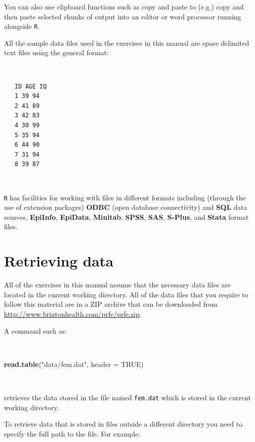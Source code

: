 \documentclass[12pt,a4paper]{book}
\newenvironment{Shaded}{\begin{snugshade}}{\end{snugshade}}
\newcommand{\DataTypeTok}[1]{\textcolor[rgb]{0.13,0.29,0.53}{#1}}
\newcommand{\KeywordTok}[1]{\textcolor[rgb]{0.13,0.29,0.53}{\textbf{#1}}}
\newcommand{\NormalTok}[1]{#1}
\newcommand{\OtherTok}[1]{\textcolor[rgb]{0.56,0.35,0.01}{#1}}
\newcommand{\StringTok}[1]{\textcolor[rgb]{0.31,0.60,0.02}{#1}}
\theoremstyle{definition}
\theoremstyle{definition}
\theoremstyle{definition}
\theoremstyle{remark}
\begin{document}
You can also use clipboard functions such as copy and paste to (e.g.)
copy and then paste selected chunks of output into an editor or word
processor running alongside \texttt{R}.

All the sample data files used in the exercises in this manual are space
delimited text files using the general format:

~

\begin{verbatim}
   ID AGE IQ
   1 39 94
   2 41 89
   3 42 83
   4 30 99
   5 35 94
   6 44 90
   7 31 94
   8 39 87
\end{verbatim}

~

\texttt{R} has facilities for working with files in different formats
including (through the use of extension packages) \textbf{ODBC} (open
database connectivity) and \textbf{SQL} data sources, \textbf{EpiInfo},
\textbf{EpiData}, \textbf{Minitab}, \textbf{SPSS}, \textbf{SAS},
\textbf{S-Plus}, and \textbf{Stata} format files.

\newpage

\hypertarget{retrieving-data}{%
\section*{Retrieving data}\label{retrieving-data}}

All of the exercises in this manual assume that the necessary data files
are located in the current working directory. All of the data files that
you require to follow this material are in a ZIP archive that can be
downloaded from \url{http://www.brixtonhealth.com/prfe/prfe.zip}.

A command such as:

~

\begin{Shaded}
\begin{Highlighting}[]
\KeywordTok{read.table}\NormalTok{(}\StringTok{"data/fem.dat"}\NormalTok{, }\DataTypeTok{header =} \OtherTok{TRUE}\NormalTok{)}
\end{Highlighting}
\end{Shaded}

~

retrieves the data stored in the file named \texttt{fem.dat} which is
stored in the current working directory.

To retrieve data that is stored in files outside a different directory
you need to specify the full path to the file. For example:
\end{document}
